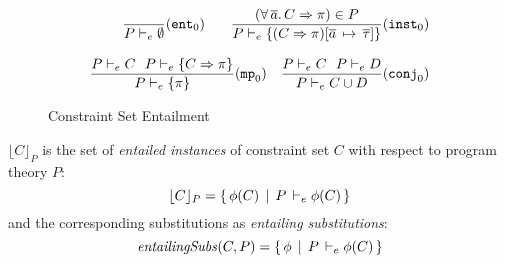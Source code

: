 \begin{figure}
   \[ \begin{array}{r}
         \begin{array}{cr}
   		\displaystyle\frac{}{P \vdash_e \emptyset} (\texttt{ent}_0)\hspace*{.3cm} &
		\displaystyle\frac
                        {(\forall\,\overline{a}.\,C\Rightarrow \pi) \in P}
			{P \vdash_e \{ (C\Rightarrow\pi)[\overline{a}\,\mapsto\,\overline{\tau}] \} }
			(\texttt{inst}_0)
         \end{array}\\ \\
         \begin{array}{cr}
		\displaystyle\frac
			{P \vdash_e C \:\:\: P \vdash_e \{C\Rightarrow\pi\} }
			{P \vdash_e \{ \pi \}} (\texttt{mp}_0)
			&
		\displaystyle\frac
			{P \vdash_e C \:\:\: P \vdash_e D}
			{P \vdash_e C \cup D} (\texttt{conj}_0)
	 \end{array}
       \end{array}
   \]
\caption{Constraint Set Entailment}
\label{Entailment-fig}
\end{figure}

\begin{Definition}

  \normalfont
  
$\lfloor C \rfloor_P$ is the set of {\em entailed instances\/} of constraint set
$C$ with respect to program theory $P$:
\[ \lfloor C \rfloor_P = \{\,\phi(C) \,\mid\, P\, \vdash_e \phi(C)\, \} \]
and the corresponding substitutions as {\em entailing substitutions\/}:
  \[ \mathit{entailingSubs\/}(C,P) = \{\,\phi \,\mid\, P\, \vdash_e \phi(C)\, \} \]


\end{Definition}

